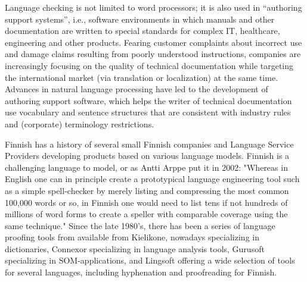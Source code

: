 \documentclass[]{../../metanetpaper}
\begin{document}
\begin{Parallel}[c]{77mm}{77mm}
{%

Language checking is not limited to word processors; it is also used
in “authoring support systems”, i.e., software environments in which
manuals and other documentation are written to special standards for
complex IT, healthcare, engineering and other products. Fearing
customer complaints about incorrect use and damage claims resulting
from poorly understood instructions, companies are increasingly
focusing on the quality of technical documentation while targeting the
international market (via translation or localization) at the same
time. Advances in natural language processing have led to the
development of authoring support software, which helps the writer of
technical documentation use vocabulary and sentence structures that
are consistent with industry rules and (corporate) terminology
restrictions.


% 
% 
% 
% 
% 
% 
% 
% 
% 
% 
% 

Finnish has a history of several small Finnish companies and Language
Service Providers developing products based on various language
models. Finnish is a challenging language to model, or as Antti Arppe
put it in 2002: "Whereas in English one can in principle create a
prototypical language engineering tool such as a simple spell-checker
by merely listing and compressing the most common 100,000 words or so,
in Finnish one would need to list tens if not hundreds of millions of
word forms to create a speller with comparable coverage using the same
technique." \cite{NoPath} Since the late 1980's, there has been a
series of language proofing tools from available from Kielikone,
nowadays specializing in dictionaries, Connexor specializing in
language analysis tools, Gurusoft specializing in SOM-applications,
and Lingsoft offering a wide selection of tools for several languages,
including hyphenation and proofreading for Finnish.

}
\end{Parallel}
\end{document}
